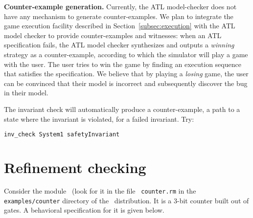 \mypar
{\bf Counter-example generation.}
Currently, the ATL model-checker does not have any mechanism to generate
counter-examples. We plan to integrate the game execution facility described in
Section~\ref{subsec:execution} with the ATL model checker to provide
counter-examples and witnesses: when an ATL specification fails, the ATL
model checker synthesizes and outputs a {\em winning} strategy as a
counter-example, according to which the simulator will play a game with the
user.  The user tries to win the game by finding an execution sequence that
satisfies the specification.  We believe that by playing a {\em losing}
game, the user can be convinced that their model is incorrect and
subsequently discover the bug in their model.

The invariant check will automatically produce a counter-example, a
path to a state where the invariant is violated,  for a
failed invariant. Try:

\begin{center}
\tt inv\_check System1 safetyInvariant
\end{center}

\section{Refinement checking}
Consider the module \SCountThree\ (look for it in the file {\tt
counter.rm} in the {\tt examples/counter} directory of the
\mocha\ distribution. It is a 3-bit counter built out of
gates. A behavioral specification for it is given below.

